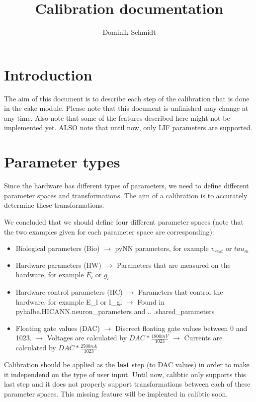 \documentclass[12pt,a4paper,bibliography=totocnumbered,listof=totocnumbered]{scrartcl}
\author{Dominik Schmidt}
\title{Calibration documentation}
\begin{document}
\maketitle
\section{Introduction}
The aim of this document is to describe each step of the calibration that is done in the cake module. Please note that this document is unfinished may change at any time. Also note that some of the features described here might not be implemented yet. ALSO note that until now, only LIF parameters are supported.

\section{Parameter types}
Since the hardware has different types of parameters, we need to define different parameter spaces and transformations. The aim of a calibration is to accurately determine these transformations.

We concluded that we should define four different parameter spaces (note that the two examples given for each parameter space are corresponding):
\begin{itemize}
\item Biological parameters (Bio)
\subitem $\rightarrow$ pyNN parameters, for example $v_{rest}$ or $tau_m$
\item Hardware parameters (HW)
\subitem $\rightarrow$ Parameters that are measured on the hardware, for example $E_l$ or $g_l$
\item Hardware control parameters (HC)
\subitem $\rightarrow$ Parameters that control the hardware, for example E\_l or I\_gl
\subitem $\rightarrow$ Found in pyhalbe.HICANN.neuron\_parameters and .. .shared\_parameters
\item Floating gate values (DAC)
\subitem $\rightarrow$ Discreet floating gate values between 0 and 1023.
\subitem $\rightarrow$ Voltages are calculated by $DAC * \frac{1800 mV}{1023}$
\subitem $\rightarrow$ Currents are calculated by $DAC * \frac{2500 nA}{1023}$
\end{itemize}
 
Calibration should be applied as the \textbf{last} step (to DAC values) in order to make it independend on the type of user input. Until now, calibtic only supports this last step and it does not properly support transformations between each of these parameter spaces. This missing feature will be implented in calibtic soon.
\end{document}
